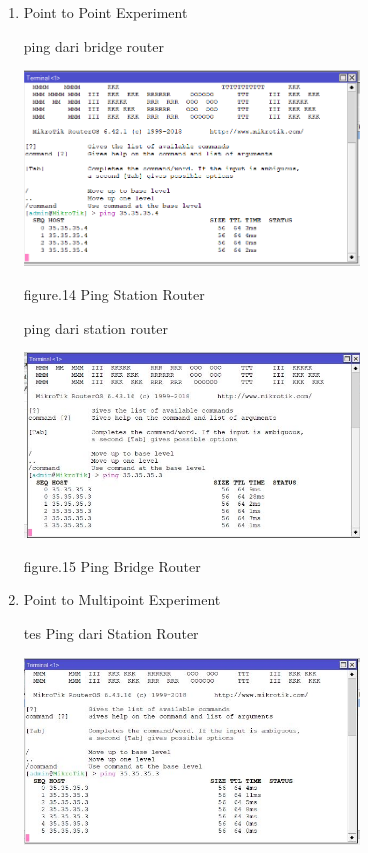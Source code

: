 \begin{enumerate}
    \item Point to Point Experiment
    
    ping dari bridge router
    \begin{center}
        \includegraphics[width=0.7\textwidth]{image/P1/PoP/5-testpingbrigde.png}    
        
        figure.14 Ping Station Router
    \end{center}

    ping dari station router 
    \begin{center}
        \includegraphics[width=0.7\textwidth]{image/P1/PoP/4-testping1station.png}    
        
        figure.15 Ping Bridge Router
    \end{center}

    \item Point to Multipoint Experiment
    
    tes Ping dari Station Router 
    \begin{center}
        \includegraphics[width=0.7\textwidth]{image/P1/PoM/3-testping.png}    
        

\end{center}
\end{enumerate}
